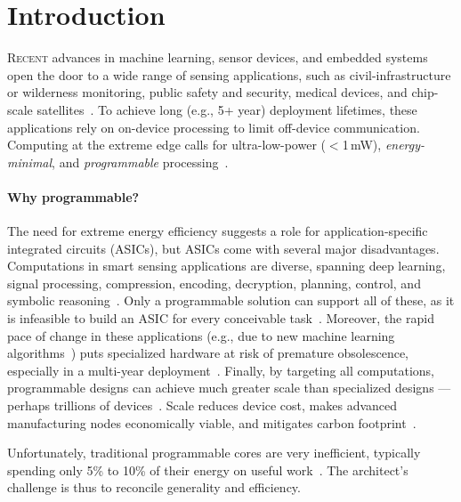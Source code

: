 \section{Introduction}
\label{sec:intro}

\lettrine{R}{ecent} advances in machine learning,
sensor devices, and
embedded systems open the door
to a wide range of sensing applications,
such as
civil-infrastructure or wilderness monitoring,
public safety and security,
medical devices,
and chip-scale satellites~\cite{kicksat2}.
%
To achieve long (e.g., 5+ year) deployment lifetimes,
these applications rely on on-device processing
to limit off-device communication.
%
Computing at the extreme edge
calls for ultra-low-power ($<$1\,mW),
\emph{energy-minimal},
and \emph{programmable} processing~\cite{sonic}.

\paragraph{Why programmable?} 
\label{intro:programmability}
The need for extreme energy efficiency suggests a role for
application-specific integrated circuits (ASICs), but ASICs
come with several major disadvantages.
%
Computations in smart sensing applications are diverse, spanning deep
learning, signal processing, compression, encoding, decryption,
planning, control, and symbolic reasoning~\cite{Gobieski2018IntermittentDN}.
%
Only a programmable solution can support all of these, as it is
infeasible to build an ASIC for every conceivable task~\cite{edge-offload,moonwalk}.
%
Moreover, the rapid pace of change in these applications (e.g., due to
new machine learning algorithms~\cite{jouppi2021ten})
puts specialized hardware at risk of premature obsolescence, especially in
a multi-year deployment~\cite{edge-offload}.
%
Finally, by targeting all computations, programmable designs
can achieve much greater scale than specialized designs --- perhaps trillions of devices~\cite{arm-trillions}.
Scale reduces device cost,
makes advanced manufacturing nodes economically viable,
and mitigates carbon footprint~\cite{gupta2022chasing}.

Unfortunately, traditional programmable cores are very inefficient,
typically spending only 5\% to 10\% of their energy on useful work~\cite{manic,snafu,horowitz:isscc14:energy-keynote}.
%
The architect's challenge is thus to reconcile generality and efficiency.

\figRipTideIntro


